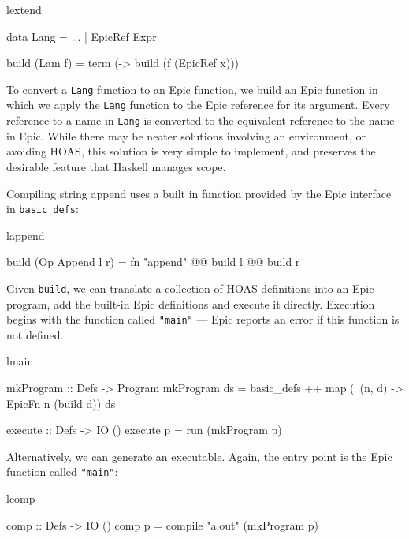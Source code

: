 \begin{SaveVerbatim}{lextend}

data Lang = ...
          | EpicRef Expr

build (Lam f) = term (\x -> build (f (EpicRef x)))

\end{SaveVerbatim}

\noindent
To convert a \texttt{Lang} function to an Epic function, we build an
Epic function in which we apply the \texttt{Lang} function to the Epic
reference for its argument. Every reference to a name in \texttt{Lang}
is converted to the equivalent reference to the name in Epic. While
there may be neater solutions involving an environment, or avoiding
HOAS, this solution is very simple to implement, and preserves the
desirable feature that Haskell manages scope.

Compiling string append uses a built in function provided by the Epic
interface in \texttt{basic\_defs}:

\begin{SaveVerbatim}{lappend}

build (Op Append l r) 
       = fn "append" @@ build l @@ build r

\end{SaveVerbatim}

\noindent
Given \texttt{build}, we can translate a collection of HOAS
definitions into an Epic program, add the built-in Epic definitions
and execute it directly. Execution begins with the function called
\texttt{"main"} --- Epic reports an error if this function is not
defined.

\begin{SaveVerbatim}{lmain}

mkProgram :: Defs -> Program
mkProgram ds = basic_defs ++ 
               map (\ (n, d) -> EpicFn n (build d)) ds

execute :: Defs -> IO ()
execute p = run (mkProgram p)

\end{SaveVerbatim}

\noindent
Alternatively, we can generate an executable. Again, the entry point
is the Epic function called \texttt{"main"}:

\begin{SaveVerbatim}{lcomp}

comp :: Defs -> IO ()
comp p = compile "a.out" (mkProgram p)

\end{SaveVerbatim}

